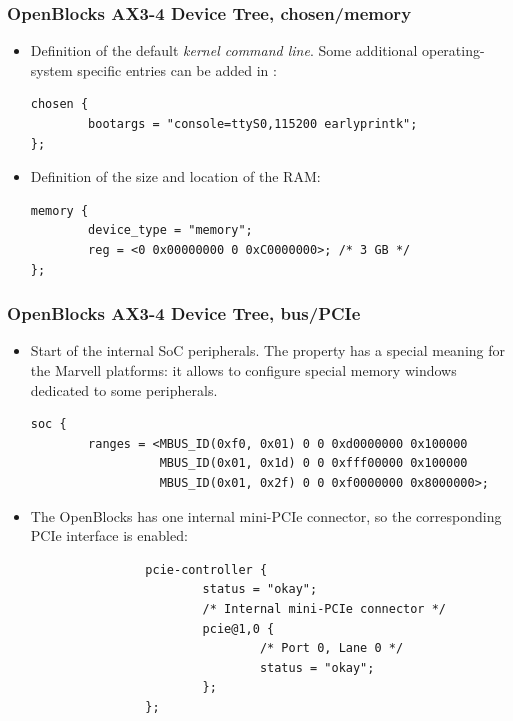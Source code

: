 \begin{frame}[fragile]
  \frametitle{OpenBlocks AX3-4 Device Tree, chosen/memory}
  \begin{itemize}
  \item Definition of the default {\em kernel command line}. Some
    additional operating-system specific entries can be added in
    :
    \begin{block}{}
    \begin{verbatim}
chosen {
        bootargs = "console=ttyS0,115200 earlyprintk";
};
\end{verbatim}
\end{block}
\item Definition of the size and location of the RAM:
  \begin{block}{}
    \begin{verbatim}
memory {
        device_type = "memory";
        reg = <0 0x00000000 0 0xC0000000>; /* 3 GB */
};
      \end{verbatim}
    \end{block}
  \end{itemize}
\end{frame}

\begin{frame}[fragile]
  \frametitle{OpenBlocks AX3-4 Device Tree, bus/PCIe}
  \begin{itemize}
  \item Start of the internal SoC peripherals. The 
    property has a special meaning for the Marvell platforms: it
    allows to configure special memory windows dedicated to some
    peripherals.
    \begin{block}{}
    \begin{verbatim}
soc {
        ranges = <MBUS_ID(0xf0, 0x01) 0 0 0xd0000000 0x100000
                  MBUS_ID(0x01, 0x1d) 0 0 0xfff00000 0x100000
                  MBUS_ID(0x01, 0x2f) 0 0 0xf0000000 0x8000000>;
\end{verbatim}
\end{block}
\item The OpenBlocks has one internal mini-PCIe connector, so the
  corresponding PCIe interface is enabled:
  \begin{block}{}
    \begin{verbatim}
                pcie-controller {
                        status = "okay";
                        /* Internal mini-PCIe connector */
                        pcie@1,0 {
                                /* Port 0, Lane 0 */
                                status = "okay";
                        };
                };
    \end{verbatim}
  \end{block}
\end{itemize}
\end{frame}

